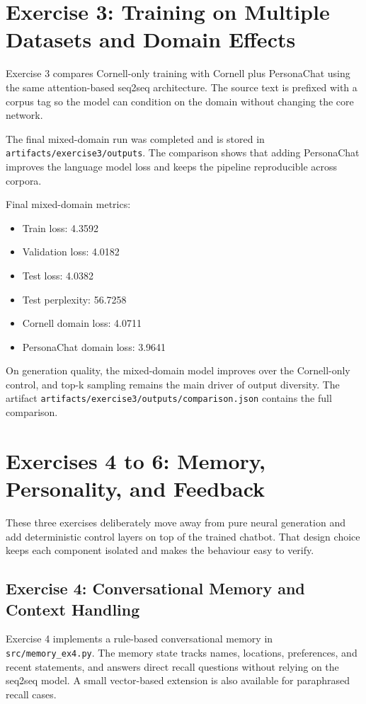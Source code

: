 \documentclass[11pt,a4paper]{article}
\begin{document}
\section{Exercise 3: Training on Multiple Datasets and Domain Effects}
Exercise 3 compares Cornell-only training with Cornell plus PersonaChat using the same attention-based seq2seq architecture. The source text is prefixed with a corpus tag so the model can condition on the domain without changing the core network.

The final mixed-domain run was completed and is stored in \texttt{artifacts/exercise3/outputs}. The comparison shows that adding PersonaChat improves the language model loss and keeps the pipeline reproducible across corpora.

Final mixed-domain metrics:
\begin{itemize}[leftmargin=*]
	\item Train loss: 4.3592
	\item Validation loss: 4.0182
	\item Test loss: 4.0382
	\item Test perplexity: 56.7258
	\item Cornell domain loss: 4.0711
	\item PersonaChat domain loss: 3.9641
\end{itemize}

On generation quality, the mixed-domain model improves over the Cornell-only control, and top-k sampling remains the main driver of output diversity. The artifact \texttt{artifacts/exercise3/outputs/comparison.json} contains the full comparison.

\section{Exercises 4 to 6: Memory, Personality, and Feedback}
These three exercises deliberately move away from pure neural generation and add deterministic control layers on top of the trained chatbot. That design choice keeps each component isolated and makes the behaviour easy to verify.

\subsection{Exercise 4: Conversational Memory and Context Handling}
Exercise 4 implements a rule-based conversational memory in \texttt{src/memory\_ex4.py}. The memory state tracks names, locations, preferences, and recent statements, and answers direct recall questions without relying on the seq2seq model. A small vector-based extension is also available for paraphrased recall cases.
\end{document}
